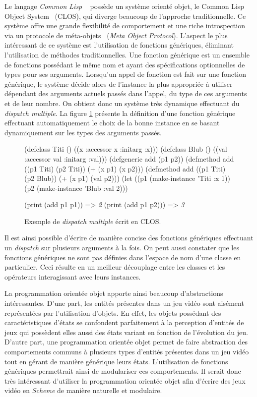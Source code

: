 \documentclass[12pt,twoside,letterpaper,francais]{book}
\newcommand{\clisp}{{\textit{Common Lisp }}}
\newcommand{\Schemelang}{{\textit{Scheme }}}
\newcommand{\schemeresult}[1]{{\it #1}}
\begin{document}
Le langage \clisp~\cite{CLISP} possède un système orienté objet, le
Common Lisp Object System~\cite{CLOS} (CLOS), qui diverge beaucoup de
l'approche traditionnelle. Ce système offre une grande flexibilité de
comportement et une riche introspection via un protocole de
méta-objets~\cite{MOP} (\textit{Meta Object Protocol}). L'aspect le
plus intéressant de ce système est l'utilisation de fonctions
génériques, éliminant l'utilisation de méthodes traditionnelles. Une
fonction générique est un ensemble de fonctions possédant le même nom
et ayant des spécifications optionnelles de types pour ses
arguments. Lorsqu'un appel de fonction est fait sur une fonction
générique, le système décide alors de l'instance la plus appropriée à
utiliser dépendant des arguments actuels passés dans l'appel, du type
de ces arguments et de leur nombre. On obtient donc un système très
dynamique effectuant du \textit{dispatch multiple}. La figure
\ref{OO:CLOS_ex} présente la définition d'une fonction générique
effectuant automatiquement le choix de la bonne instance en se basant
dynamiquement sur les types des arguments passés.\\

\begin{figure}[h!]
  \begin{schemecode}
(defclass Titi () ((x :accessor x :initarg :x)))
(defclass Blub () ((val :accessor val :initarg :val)))
(defgeneric add (p1 p2))
(defmethod add ((p1 Titi) (p2 Titi)) (+ (x p1) (x p2)))
(defmethod add ((p1 Titi) (p2 Blub)) (+ (x p1) (val p2)))
(let ((p1 (make-instance 'Titi :x 1))
      (p2 (make-instance 'Blub :val 2)))

  (print (add p1 p1))  => \schemeresult{2}
  (print (add p1 p2))) => \schemeresult{3}
  \end{schemecode}
  \caption{Exemple de \textit{dispatch multiple} écrit en CLOS.}
  \label{OO:CLOS_ex}
\end{figure}

Il est ainsi possible d'écrire de manière concise des fonctions
génériques effectuant un \textit{dispatch} sur plusieurs arguments à
la fois. On peut aussi constater que les fonctions génériques ne sont
pas définies dans l'espace de nom d'une classe en particulier. Ceci
résulte en un meilleur découplage entre les classes et les opérateurs
interagissant avec leurs instances.

La programmation orientée objet apporte ainsi beaucoup d'abstractions
intéressantes. D'une part, les entités présentes dans un jeu vidéo
sont aisément représentées par l'utilisation d'objets. En effet, les
objets possédant des caractéristiques d'états se confondent
parfaitement à la perception d'entités de jeux qui possèdent elles
aussi des états variant en fonction de l'évolution du jeu. D'autre
part, une programmation orientée objet permet de faire abstraction des
comportements communs à plusieurs types d'entités présentes dans un
jeu vidéo tout en gérant de manière générique leurs états.
L'utilisation de fonctions génériques permettrait ainsi de modulariser
ces comportements. Il serait donc très intéressant d'utiliser la
programmation orientée objet afin d'écrire des jeux vidéo en
\Schemelang de manière naturelle et modulaire.
\end{document}

